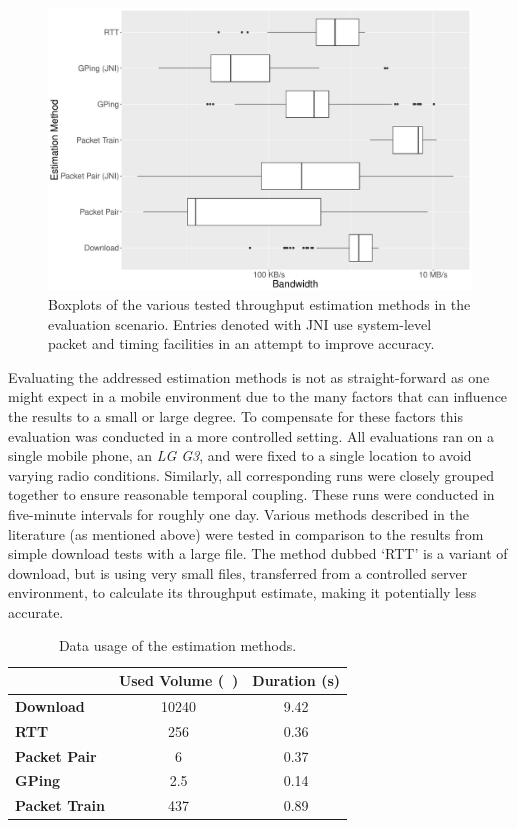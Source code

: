 \begin{figure}[!t]
	\centering
	\includegraphics[width = 1.0\columnwidth]{images/BWest-boxplots.pdf}
	\caption{Boxplots of the various tested throughput estimation methods in the evaluation scenario. Entries denoted with JNI use system-level packet and timing facilities in an attempt to improve accuracy.}
\label{fig:boxplots}
\end{figure}

Evaluating the addressed estimation methods is not as straight-forward as one might expect in a mobile environment due to the many factors that can influence the results to a small or large degree. To compensate for these factors this evaluation was conducted in a more controlled setting. All evaluations ran on a single mobile phone, an \textit{LG G3}, and were fixed to a single location to avoid varying radio conditions. Similarly, all corresponding runs were closely grouped together to ensure reasonable temporal coupling. These runs were conducted in five-minute intervals for roughly one day. Various methods described in the literature (as mentioned above) were tested in comparison to the results from simple download tests with a large file. The method dubbed `RTT' is a variant of download, but is using very small files, transferred from a controlled server environment, to calculate its throughput estimate, making it potentially less accurate.

\begin{table}[!t]
\caption{Data usage of the estimation methods.}
\label{tab:datausage}
	\begin{tabu}{XSS}
		\toprule
		 & {\textbf{Used Volume (\si{\kilo\byte})}} & {\textbf{Duration (\si{\second})}} \\
		 \midrule
		\textbf{Download} & 10240 & 9.42 \\
		\textbf{RTT} & 256 & 0.36 \\
		\textbf{Packet Pair} & 6 & 0.37 \\
		\textbf{GPing} & 2.5 & 0.14 \\
		\textbf{Packet Train} & 437 & 0.89 \\ %
		\bottomrule
	\end{tabu}
\end{table}

